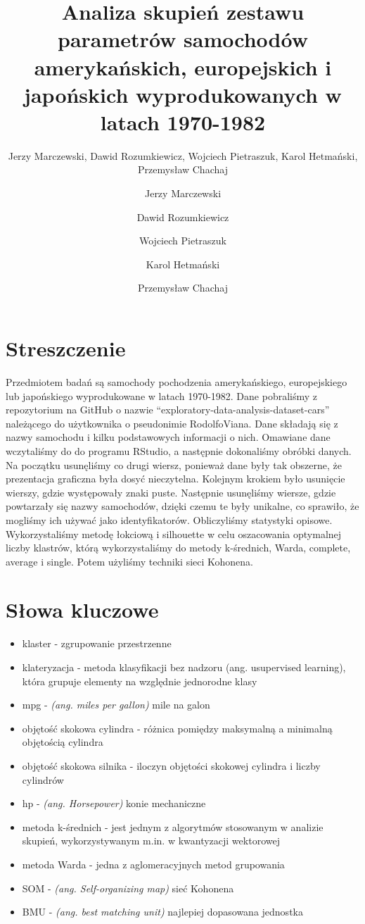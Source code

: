 \documentclass{article}
\title{Analiza skupień zestawu parametrów samochodów amerykańskich, europejskich i japońskich wyprodukowanych w latach 1970-1982}
\author{\fontsize{11}{13}\selectfont Jerzy Marczewski, \newline Dawid Rozumkiewicz, Wojciech Pietraszuk, Karol Hetmański, Przemysław Chachaj}
\author{
  Jerzy Marczewski\\
  \and
  Dawid Rozumkiewicz\\
  \and
  Wojciech Pietraszuk\\
  \and
  Karol Hetmański\\
  \and
  Przemysław Chachaj\\
}
\date{}
\begin{document}
\maketitle

\section{Streszczenie}
Przedmiotem badań są samochody pochodzenia amerykańskiego, europejskiego lub japońskiego wyprodukowane
w latach 1970-1982. Dane pobraliśmy z repozytorium na GitHub o nazwie ``exploratory-data-analysis-dataset-cars''
należącego do użytkownika o pseudonimie RodolfoViana. Dane składają się z nazwy samochodu i kilku podstawowych 
informacji o nich. Omawiane dane wczytaliśmy do do programu RStudio, a następnie dokonaliśmy obróbki danych.
Na początku usunęliśmy co drugi wiersz, ponieważ dane były tak obszerne, że prezentacja graficzna była dosyć nieczytelna.
Kolejnym krokiem było usunięcie wierszy, gdzie występowały znaki puste. Następnie usunęliśmy wiersze, gdzie powtarzały się 
nazwy samochodów, dzięki czemu te były unikalne, co sprawiło, że mogliśmy ich używać jako identyfikatorów. 
Obliczyliśmy statystyki opisowe. Wykorzystaliśmy metodę łokciową i silhouette w celu oszacowania optymalnej liczby klastrów, 
którą wykorzystaliśmy do metody k-średnich, Warda, complete, average i single. Potem użyliśmy techniki sieci Kohonena.


\section{Słowa kluczowe}
    \begin{itemize}
        \item klaster - zgrupowanie przestrzenne 
        \item klateryzacja - metoda klasyfikacji bez nadzoru (ang. usupervised learning), która grupuje elementy na względnie jednorodne klasy
        \item mpg - \textit{(ang. miles per gallon)} mile na galon
        \item objętość skokowa cylindra - różnica pomiędzy maksymalną a minimalną objętością cylindra
        \item objętość skokowa silnika - iloczyn objętości skokowej cylindra i liczby cylindrów
        \item hp - \textit{(ang. Horsepower)} konie mechaniczne
        \item metoda k-średnich - jest jednym z algorytmów stosowanym w analizie skupień, wykorzystywanym m.in. w kwantyzacji wektorowej
        \item metoda Warda -  jedna z aglomeracyjnych metod grupowania
        \item SOM - \textit{(ang. Self-organizing map)} sieć Kohonena 
        \item BMU - \textit{(ang. best matching unit)} najlepiej dopasowana jednostka
    \end{itemize}
\end{document}

